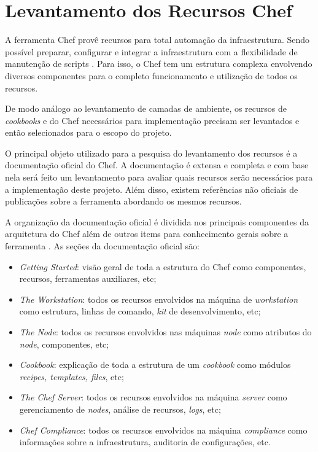 \section{Levantamento dos Recursos Chef}
\label{sec:rec-chef}

A ferramenta Chef provê recursos para total automação da infraestrutura.
Sendo possível preparar, configurar e integrar a infraestrutura com a
flexibilidade de manutenção de scripts \cite{sharma:2015}. Para isso, o
Chef tem um estrutura complexa envolvendo diversos componentes para
o completo funcionamento e utilização de todos os recursos.

De modo análogo ao levantamento de camadas de ambiente, os recursos
de \textit{cookbooks} e do Chef necessários para implementação precisam
ser levantados e então selecionados para o escopo do projeto.

O principal objeto utilizado para a pesquisa do levantamento dos recursos
é a documentação oficial do Chef. A documentação é extensa e completa e
com base nela será feito um levantamento para avaliar quais recursos
serão necessários para a implementação deste projeto. Além disso, existem
referências não oficiais de publicações sobre a ferramenta abordando os
mesmos recursos.

A organização da documentação oficial é dividida nos principais componentes
da arquitetura do Chef além de outros items para conhecimento gerais sobre a
ferramenta \cite{chefdoc:2016}. As seções da documentação oficial são:

\begin{itemize}
  \item \textit{Getting Started}: visão geral de toda a estrutura do Chef
    como componentes, recursos, ferramentas auxiliares, etc;
  \item \textit{The Workstation}: todos os recursos envolvidos na máquina de \textit{workstation}
    como estrutura, linhas de comando, \textit{kit} de desenvolvimento, etc;
  \item \textit{The Node}: todos os recursos envolvidos nas máquinas \textit{node}
    como atributos do \textit{node}, componentes, etc;
  \item \textit{Cookbook}: explicação de toda a estrutura de um \textit{cookbook}
    como módulos \textit{recipes, templates, files}, etc;
  \item \textit{The Chef Server}: todos os recursos envolvidos na máquina \textit{server}
    como gerenciamento de \textit{nodes}, análise de recursos, \textit{logs}, etc;
  \item \textit{Chef Compliance}: todos os recursos envolvidos na máquina \textit{compliance}
    como informações sobre a infraestrutura, auditoria de configurações, etc.
\end{itemize}

